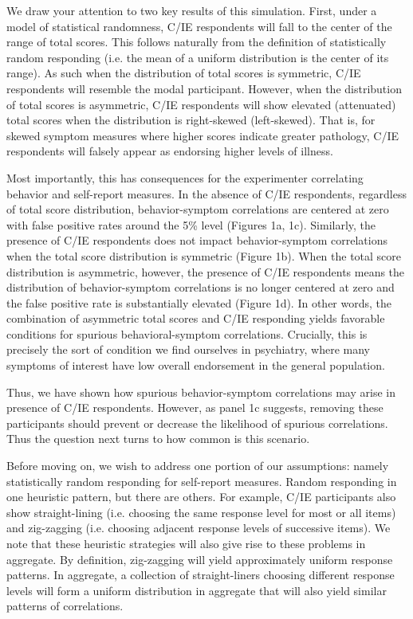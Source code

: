 \documentclass[a4paper,notitlepage,12pt]{article}
\begin{document}
We draw your attention to two key results of this simulation. First, under a model of statistical randomness, C/IE respondents will fall to the center of the range of total scores. This follows naturally from the definition of statistically random responding (i.e. the mean of a uniform distribution is the center of its range). As such when the distribution of total scores is symmetric, C/IE respondents will resemble the modal participant. However, when the distribution of total scores is asymmetric, C/IE respondents will show elevated (attenuated) total scores when the distribution is right-skewed (left-skewed). That is, for skewed symptom measures where higher scores indicate greater pathology, C/IE respondents will falsely appear as endorsing higher levels of illness.


Most importantly, this has consequences for the experimenter correlating behavior and self-report measures. In the absence of C/IE respondents, regardless of total score distribution, behavior-symptom correlations are centered at zero with false positive rates around the 5\% level (Figures 1a, 1c). Similarly, the presence of C/IE respondents does not impact behavior-symptom correlations when the total score distribution is symmetric (Figure 1b). When the total score distribution is asymmetric, however, the presence of C/IE respondents means the distribution of behavior-symptom correlations is no longer centered at zero and the false positive rate is substantially elevated (Figure 1d). In other words, the combination of asymmetric total scores and C/IE responding yields favorable conditions for spurious behavioral-symptom correlations. Crucially, this is precisely the sort of condition we find ourselves in psychiatry, where many symptoms of interest have low overall endorsement in the general population.

Thus, we have shown how spurious behavior-symptom correlations may arise in presence of C/IE respondents. However, as panel 1c suggests, removing these participants should prevent or decrease the likelihood of spurious correlations. Thus the question next turns to how common is this scenario. 

Before moving on, we wish to address one portion of our assumptions: namely statistically random responding for self-report measures. Random responding in one heuristic pattern, but there are others. For example, C/IE participants also show straight-lining (i.e. choosing the same response level for most or all items) and zig-zagging (i.e. choosing adjacent response levels of successive items). We note that these heuristic strategies will also give rise to these problems in aggregate. By definition, zig-zagging will yield approximately uniform response patterns. In aggregate, a collection of straight-liners choosing different response levels will form a uniform distribution in aggregate that will also yield similar patterns of correlations.
\end{document}
